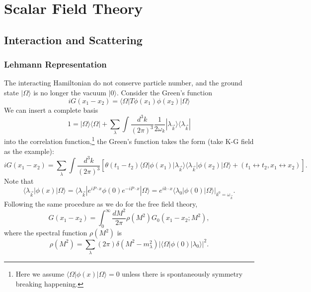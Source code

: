 \chapter{Scalar Field Theory}

\section{Interaction and Scattering}

\subsection{Lehmann Representation}
The interacting Hamiltonian do not conserve particle number, and the ground state $|\Omega\rangle$ is no longer the vacuum $|0\rangle$.
Consider the Green's function
\begin{equation*}
	iG(x_1-x_2) = \langle\Omega|T\phi(x_1)\phi(x_2)|\Omega\rangle 
\end{equation*}
We can insert a complete basis 
\begin{equation*}
	1 = |\Omega\rangle\langle\Omega| + \sum_\lambda\int\frac{d^3 k}{(2\pi)^3}\frac{1}{2\omega_k}|\lambda_{\vec k}\rangle \langle\lambda_{\vec k}|
\end{equation*}
into the correlation function,\footnote{Here we assume $\langle\Omega|\phi(x)|\Omega\rangle=0$ unless there is spontaneously symmetry breaking happening.} the Green's function takes the form (take K-G field as the example):
\begin{equation*}
	iG(x_1-x_2) = \sum_\lambda \int\frac{d^3 k}{(2\pi)^3}
	\left[\theta(t_1-t_2)\langle\Omega|\phi(x_1)|\lambda_{\vec k}\rangle\langle\lambda_{\vec k}|\phi(x_2)|\Omega\rangle + (t_1\leftrightarrow t_2, x_1 \leftrightarrow x_2)\right].
\end{equation*}
Note that
\begin{equation*}
	\langle\lambda_{\vec k}|\phi(x)|\Omega\rangle 
	= \langle\lambda_{\vec k}|e^{iP\cdot x}\phi(0) e^{-iP\cdot x}|\Omega\rangle
	= e^{ik\cdot x} \left.\langle\lambda_{0}|\phi(0)|\Omega\rangle\right|_{k^0=\omega_{\vec k}}.
\end{equation*}
Following the same procedure as we do for the free field theory, 
\begin{equation}
	G(x_1-x_2) = \int_0^\infty \frac{dM^2}{2\pi} \rho(M^2) G_0(x_1-x_2;M^2),
\end{equation}
where the spectral function $\rho(M^2)$ is
\begin{equation*}
	\rho(M^2) = \sum_\lambda(2\pi)\delta(M^2-m_\lambda^2)|\langle\Omega|\phi(0)|\lambda_0\rangle|^2.
\end{equation*}
